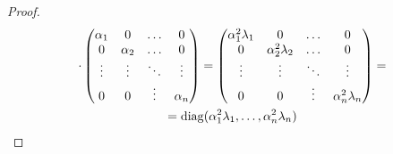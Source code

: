 \documentclass[../main.tex]{subfiles}
\begin{document}
\begin{proof}
\begin{equation*}
\begin{gathered}
      \cdot
      \begin{pmatrix}
        \alpha_1 & 0 & \hdots & 0 \\
        0 & \alpha_2 & \hdots & 0 \\
        \vdots & \vdots & \ddots & \vdots \\
        0 & 0 & \vdots & \alpha_n
      \end{pmatrix}
      =
      \begin{pmatrix}
        \alpha_1^2 \lambda_1 & 0 & \hdots & 0 \\
        0 & \alpha_2^2 \lambda_2 & \hdots & 0 \\
        \vdots & \vdots & \ddots & \vdots \\
        0 & 0 & \vdots & \alpha_n^2 \lambda_n
      \end{pmatrix}
      = \\ =
      \operatorname{diag}(\alpha_1^2 \lambda_1, \dotsc, \alpha_n^2 \lambda_n)
    \end{gathered}
  \end{equation*}
\end{proof}
\end{document}
